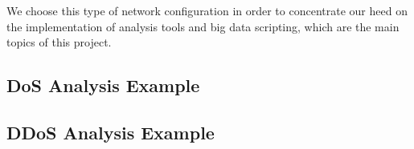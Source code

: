We choose this type of network configuration in order to concentrate our heed on the implementation of analysis tools and big data scripting, which are the main topics of this project.
 


\subsection{DoS Analysis Example}

\subsection{DDoS Analysis Example}




















